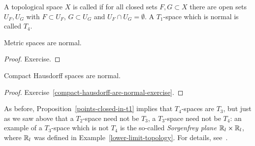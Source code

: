 \begin{defn}
  A topological space $X$ is called  if for all closed sets $F,G \subset X$ there are open sets $U_F, U_G$ with $F \subset U_F$, $G \subset U_G$ and $U_F \cap U_G = \emptyset$. A $T_1$-space which is normal is called $T_4$.
\end{defn}
\begin{prop}
  \label{metric-spaces-normal}
  Metric spaces are normal.
\end{prop}
\begin{proof}
  Exercise.
\end{proof}
\begin{prop}
  \label{compact-hausdorff-normal}
  Compact Hausdorff spaces are normal.
\end{prop}
\begin{proof}
  Exercise~\ref{compact-hausdorff-are-normal-exercise}.
\end{proof}
\begin{example}
  As before, Proposition~\ref{points-closed-in-t1} implies that $T_4$-spaces are $T_3$, but just as we saw above that a $T_2$-space need not be $T_3$, a $T_3$-space need not be $T_4$: an example of a $T_3$-space which is not $T_4$ is the so-called \emph{Sorgenfrey plane} $\mathbb{R}_l \times \mathbb{R}_l$, where $\mathbb{R}_l$ was defined in Example~\ref{lower-limit-topology}. For details, see~\cite[\S 31, Example 3]{Mun}.
\end{example}

